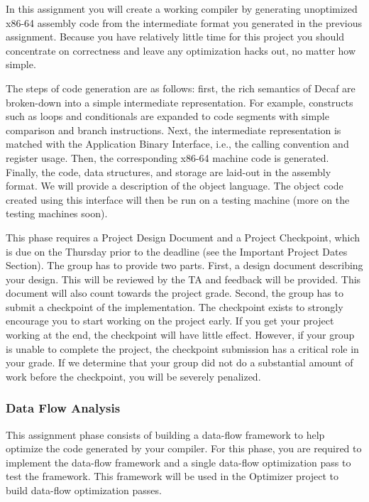 In this assignment you will create a working compiler by generating
unoptimized x86-64 assembly code from the intermediate format you
generated in the previous assignment. Because you have relatively
little time for this project you should concentrate on correctness and
leave any optimization hacks out, no matter how simple.

The steps of code generation are as follows: first, the rich semantics of
Decaf are broken-down into a simple intermediate representation. For
example, constructs such as loops and conditionals are expanded to
code segments with simple comparison and branch instructions. Next,
the intermediate representation is matched with the Application Binary
Interface, i.e., the calling convention and register usage. Then, the
corresponding x86-64 machine code is generated. Finally, the code,
data structures, and storage are laid-out in the assembly
format. We will provide a description of the object language. The object
code created using this interface will then be run on a testing
machine (more on the testing machines soon).

This phase requires a Project Design Document and a Project
Checkpoint, which is due on the Thursday prior to the deadline (see
the Important Project Dates Section). The group has to provide two
parts. First, a design document describing your design. This will be
reviewed by the TA and feedback will be provided. This document will
also count towards the project grade. Second, the group has to
submit a checkpoint of the implementation. The checkpoint exists to
strongly encourage you to start working on the project early. If you
get your project working at the end, the checkpoint will have little
effect. However, if your group is unable to complete the project,
the checkpoint submission has a critical role in your grade. If we
determine that your group did not do a substantial amount of work
before the checkpoint, you will be severely penalized.

\subsubsection*{Data Flow Analysis}

This assignment phase consists of building a data-flow framework to
help optimize the code generated by your compiler. For this phase, you
are required to implement the data-flow framework and a single
data-flow optimization pass to test the framework.  This framework
will be used in the Optimizer project to build data-flow optimization
passes.

